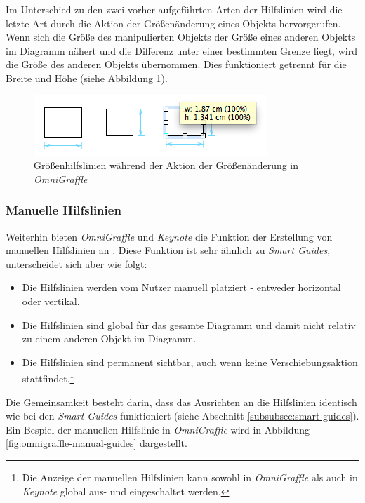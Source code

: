 Im Unterschied zu den zwei vorher aufgeführten Arten der Hilfslinien wird die letzte Art durch die Aktion der Größenänderung eines Objekts hervorgerufen. Wenn sich die Größe des manipulierten Objekts der Größe eines anderen Objekts im Diagramm nähert und die Differenz unter einer bestimmten Grenze liegt, wird die Größe des anderen Objekts übernommen. Dies funktioniert getrennt für die Breite und Höhe (siehe Abbildung \ref{fig:omnigraffle-sizing-guides}).

\begin{figure}[hbt]
    \centering
    \includegraphics{resources/omnigraffle-sizing-guides.png}
    \caption{Größenhilfslinien während der Aktion der Größenänderung in \textit{OmniGraffle}}
    \label{fig:omnigraffle-sizing-guides}
\end{figure}

\subsubsection{Manuelle Hilfslinien}

Weiterhin bieten \textit{OmniGraffle} und \textit{Keynote} die Funktion der Erstellung von manuellen Hilfslinien an \cite{08OmniGraffle, 11Keynote}. Diese Funktion ist sehr ähnlich zu \textit{Smart Guides}, unterscheidet sich aber wie folgt:

\begin{itemize}
    \item Die Hilfslinien werden vom Nutzer manuell platziert - entweder horizontal oder vertikal.
    \item Die Hilfslinien sind global für das gesamte Diagramm und damit nicht relativ zu einem anderen Objekt im Diagramm.
    \item Die Hilfslinien sind permanent sichtbar, auch wenn keine Verschiebungsaktion stattfindet.\footnote{Die Anzeige der manuellen Hilfslinien kann sowohl in \textit{OmniGraffle} als auch in \textit{Keynote} global aus- und eingeschaltet werden.}
\end{itemize}

Die Gemeinsamkeit besteht darin, dass das Ausrichten an die Hilfslinien identisch wie bei den \textit{Smart Guides} funktioniert (siehe Abschnitt \ref{subsubsec:smart-guides}). Ein Bespiel der manuellen Hilfslinie in \textit{OmniGraffle} wird in Abbildung \ref{fig:omnigraffle-manual-guides} dargestellt.

